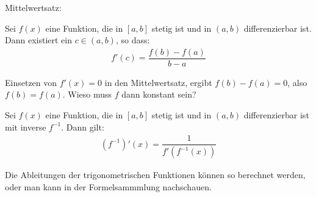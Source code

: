 \documentclass[12pt]{article}
\newenvironment{definition}[2][Definition]{\begin{trivlist}
        \item[\hskip \labelsep {\bfseries #1}\hskip \labelsep {\bfseries #2.}]}{\flushright{$\square$}\end{trivlist}}
\newenvironment{problem}[2][\textcolor{blue}{Tipps \& Tricks zu}]{\begin{trivlist}
        \item[\hskip \labelsep {\bfseries #1}\hskip \labelsep {\bfseries \textcolor{blue}{#2}.}]}{\end{trivlist}}
\newenvironment{remark}[2][Bemerkung]{\begin{trivlist}
        \item[\hskip \labelsep {\bfseries #1}\hskip \labelsep {\bfseries #2.}]}{\end{trivlist}}
\begin{document}
\begin{problem}{4}
Mittelwertsatz:
\begin{definition}{[Mittelwertsatz]}
    Sei $f(x)$ eine Funktion, die in $[a,b]$ stetig ist und in $(a,b)$ differenzierbar ist. Dann existiert ein $c\in(a,b)$, so dass:
    \begin{align*}
        f'(c)=\dfrac{f(b)-f(a)}{b-a}
    \end{align*}
\end{definition}
Einsetzen von $f'(x)=0$ in den Mittelwertsatz, ergibt $f(b)-f(a)=0$, also $f(b)=f(a)$. Wieso muss $f$ dann konstant sein?
\begin{remark}{[Ableitungen von inversen Funktionen]}
    Sei $f(x)$ eine Funktion, die in $[a,b]$ stetig ist und in $(a,b)$ differenzierbar ist mit inverse $f^{-1}$. Dann gilt:
    \begin{align*}
        (f^{-1})'(x)=\dfrac{1}{f'(f^{-1}(x))}
    \end{align*}
\end{remark}
Die Ableitungen der trigonometrischen Funktionen können so berechnet werden, oder man kann in der Formelsammmlung nachschauen.
\end{problem}
\end{document}
